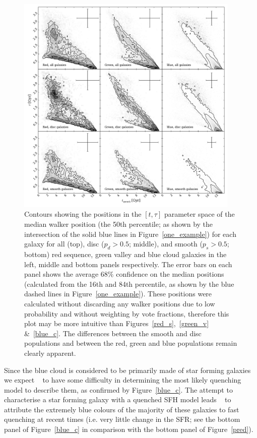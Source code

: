 \begin{figure}
\includegraphics[width=0.95\textwidth]{morphology/contour_t_tau_mcmc_bestfit.pdf}
\caption[Best fit contours for red, green and blue clean galaxies]{Contours showing the positions in the $[t, \tau]$ parameter space of the median walker position (the 50th percentile; as shown by the intersection of the solid blue lines in Figure~\ref{one_example}) for each galaxy for all (top), disc ($p_d > 0.5$; middle), and smooth ($p_s > 0.5$; bottom) red sequence, green valley and blue cloud galaxies in the left, middle and bottom panels respectively. The error bars on each panel shows the average $68\%$ confidence on the median positions (calculated from the 16th and 84th percentile, as shown by the blue dashed lines in Figure~\ref{one_example}). These positions were calculated without discarding any walker positions due to low probability and without weighting by vote fractions, therefore this plot may be more intuitive than Figures~\ref{red_s},~\ref{green_v} \&~\ref{blue_c}. The differences between the smooth and disc populations and between the red, green and blue populations remain clearly apparent.}
\label{fig:bestfit}
\end{figure}

Since the blue cloud is considered to be primarily made of star forming galaxies we expect \starpy~ to have some difficulty in determining the most likely quenching model to describe them, as confirmed by Figure~\ref{blue_c}. The attempt to characterise a star forming galaxy with a quenched SFH model leads \starpy~ to attribute the extremely blue colours of the majority of these galaxies to fast quenching at recent times (i.e. very little change in the SFR; see the bottom panel of Figure~\ref{blue_c} in comparison with the bottom panel of Figure~\ref{pred}).

